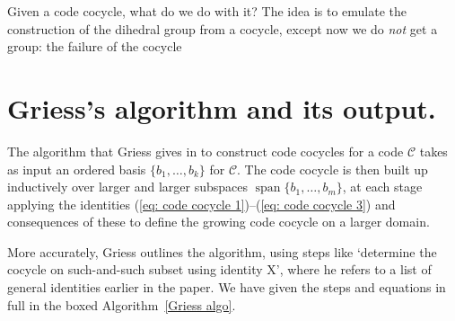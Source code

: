 \documentclass{article}
\theoremstyle{plain}
\theoremstyle{definition}
\def \cC {\mathcal{C}}
\DeclareMathOperator{\Span}{span}
\begin{document}
Given a code cocycle, what do we do with it? 
The idea is to emulate the construction of the dihedral group from a cocycle, except now we do \emph{not} get a group: the failure of the cocycle 

\section{Griess's algorithm and its output.}

The algorithm that Griess gives in \cite[Theorem 10]{Griess} to construct code cocycles for a code $\cC$ takes as input an ordered  basis $\{b_1,\ldots,b_k\}$ for $\cC$. 
The code cocycle is then built up inductively over larger and larger subspaces $\Span\{b_1,\ldots,b_m\}$, at each stage applying the identities (\ref{eq: code cocycle 1})--(\ref{eq: code cocycle 3}) and consequences of these to define the growing code cocycle on a larger domain.

More accurately, Griess outlines the algorithm, using steps like `determine the cocycle on such-and-such subset using identity X', where he refers to a list of general identities earlier in the paper. We have given the steps and equations in full in the boxed Algorithm~\ref{Griess algo}.


\end{document}
